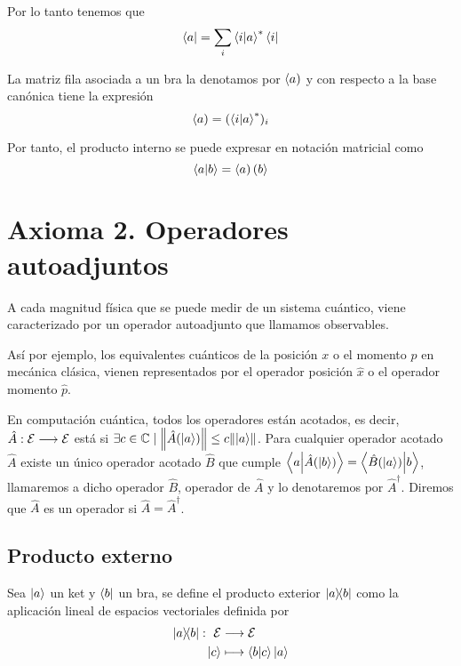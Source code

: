 Por lo tanto tenemos que
\begin{equation}
	\label{eq:bra-dirac}
	\bra{a}=\sum_i\braket{i}{a}^*\bra{i}
\end{equation}

La matriz fila asociada a un bra la denotamos por $\left<a\right)$ y con respecto a la base canónica tiene la expresión
\begin{equation}
	\label{eq:bra-matriz}
	\left<a\right)=(\braket{i}{a}^*)_i
\end{equation}

Por tanto, el producto interno se puede expresar en notación matricial como
\begin{equation}
	\label{eq:producto-interno-matriz}
	\braket{a}{b}=\left<a\right)\left(b\right>
\end{equation}

\section{Axioma 2. Operadores autoadjuntos}\label{sec:axioma-2.-operadores-autoadjuntos}
\begin{definition}[Axioma 2]
	A cada magnitud física que se puede medir de un sistema cuántico, viene caracterizado por un operador autoadjunto que llamamos observables.
\end{definition}
Así por ejemplo, los equivalentes cuánticos de la posición $x$ o el momento $p$ en mecánica clásica, vienen representados por el operador posición $\hat{x}$ o el operador momento $\hat{p}$.

En computación cuántica, todos los operadores están acotados, es decir, $\hat{A}:\mathcal{E}\longrightarrow \mathcal{E}$ está  si  $\exists c\in\mathbb{C}\mid\norm{\hat{A}(\ket{a})}\leq c\norm{\ket{a}}$.
Para cualquier operador acotado $\hat{A}$ existe un único operador acotado $\hat{B}$ que cumple $\braket{a}{\hat{A}(\ket{b})}=\braket{\hat{B}(\ket{a})}{b}$, llamaremos a dicho operador $\hat{B}$, operador  de $\hat{A}$ y lo denotaremos por $\hat{A}^\dagger$.
Diremos que $\hat{A}$ es un operador  si $\hat{A}=\hat{A}^\dagger$.

\subsection{Producto externo}\label{subsec:producto-externo}
Sea $\ket{a}$ un ket y $\bra{b}$ un bra, se define el producto exterior $\ketbra{a}{b}$ como la aplicación lineal de espacios vectoriales definida por
\begin{equation}
	\label{eq:producto-externo}
	\begin{split}
		\ketbra{a}{b}:\ \mathcal{E} & \longrightarrow \mathcal{E} \\ \ket{c} & \longmapsto \braket{b}{c}\ket{a}
	\end{split}
\end{equation}

